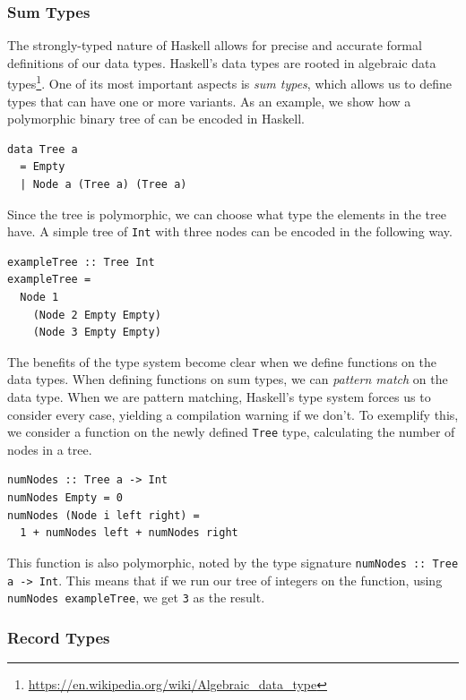 \documentclass[a4paper,english]{ifimaster}
\begin{document}
\subsubsection{Sum Types}%
\label{ssub:a_powerful_type_system}

The strongly-typed nature of Haskell allows for precise and accurate formal definitions of our data types. Haskell's data types are rooted in algebraic data types\footnote{\url{https://en.wikipedia.org/wiki/Algebraic_data_type}}. One of its most important aspects is \textit{sum types}, which allows us to define types that can have one or more variants. As an example, we show how a polymorphic binary tree of can be encoded in Haskell.

\begin{verbatim}
data Tree a
  = Empty
  | Node a (Tree a) (Tree a)
\end{verbatim}

Since the tree is polymorphic, we can choose what type the elements in the tree have. A simple tree of \texttt{Int} with three nodes can be encoded in the following way.

\begin{verbatim}
exampleTree :: Tree Int
exampleTree =
  Node 1
    (Node 2 Empty Empty)
    (Node 3 Empty Empty)
\end{verbatim}

The benefits of the type system become clear when we define functions on the data types. When defining functions on sum types, we can \textit{pattern match} on the data type. When we are pattern matching, Haskell's type system forces us to consider every case, yielding a compilation warning if we don't. To exemplify this, we consider a function on the newly defined \texttt{Tree} type, calculating the number of nodes in a tree.

\begin{verbatim}
numNodes :: Tree a -> Int
numNodes Empty = 0
numNodes (Node i left right) = 
  1 + numNodes left + numNodes right
\end{verbatim}

This function is also polymorphic, noted by the type signature \texttt{numNodes :: Tree a -> Int}. This means that if we run our tree of integers on the function, using \texttt{numNodes exampleTree}, we get \texttt{3} as the result.

\subsubsection{Record Types}%
\label{ssub:record_types}
\end{document}
